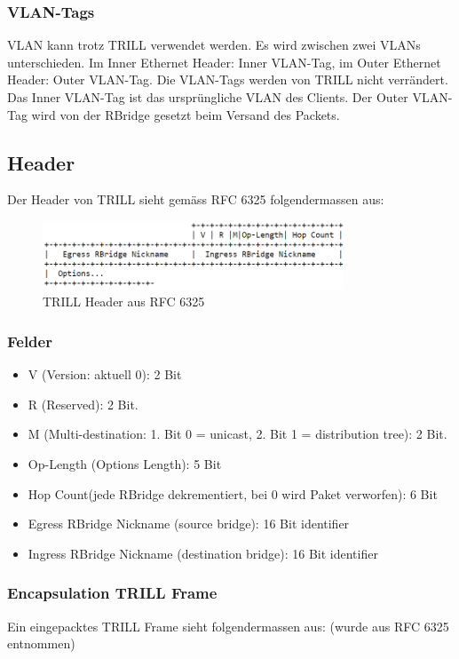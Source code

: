 \documentclass[a4,12pt]{scrartcl}
\begin{document}
\subsubsection{VLAN-Tags}
VLAN kann trotz TRILL verwendet werden. Es wird zwischen zwei VLANs unterschieden. Im Inner Ethernet Header: Inner VLAN-Tag, im Outer Ethernet Header: Outer VLAN-Tag. Die VLAN-Tags werden von TRILL nicht verrändert. Das Inner VLAN-Tag ist das ursprüngliche VLAN des Clients. Der Outer VLAN-Tag wird von der RBridge gesetzt beim Versand des Packets. 

\subsection{Header}
Der Header von TRILL sieht gemäss RFC 6325 folgendermassen aus: 

\begin{figure} [H]
	\begin{center}
	\includegraphics[width=0.80\textwidth]{./pictures/trill_header.png}
	\caption{TRILL Header aus RFC 6325}
	\label{x}
	\end{center}
\end{figure}
\newpage

\subsubsection{Felder}
\begin{itemize}
\item V (Version: aktuell 0): 2 Bit
\item R (Reserved): 2 Bit.
\item M (Multi-destination: 1. Bit 0 = unicast, 2. Bit 1 = distribution tree): 2 Bit.
\item Op-Length (Options Length): 5 Bit
\item Hop Count(jede RBridge dekrementiert, bei 0 wird Paket verworfen): 6 Bit
\item Egress RBridge Nickname (source bridge): 16 Bit identifier
\item Ingress RBridge Nickname (destination bridge): 16 Bit identifier
\end{itemize}

\subsubsection{Encapsulation TRILL Frame}
Ein eingepacktes TRILL Frame sieht folgendermassen aus: (wurde aus RFC 6325 entnommen) 
\end{document}
